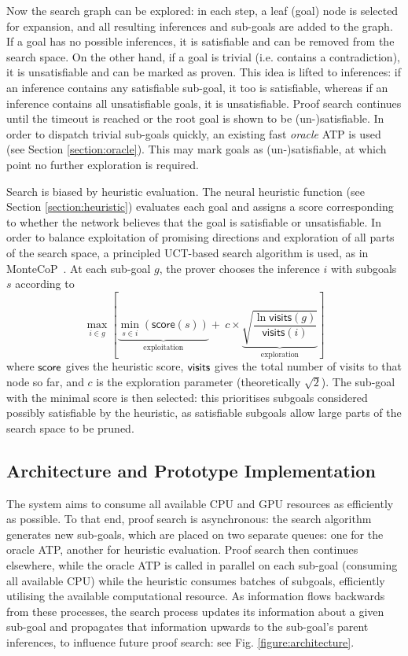 \documentclass{llncs}
\begin{document}
Now the search graph can be explored: in each step, a leaf (goal) node is selected for expansion, and all resulting inferences and sub-goals are added to the graph.
If a goal has no possible inferences, it is satisfiable and can be removed from the search space.
On the other hand, if a goal is trivial (i.e. contains a contradiction), it is unsatisfiable and can be marked as proven.
This idea is lifted to inferences: if an inference contains any satisfiable sub-goal, it too is satisfiable, whereas if an inference contains all unsatisfiable goals, it is unsatisfiable.
Proof search continues until the timeout is reached or the root goal is shown to be (un-)satisfiable.
In order to dispatch trivial sub-goals quickly, an existing fast \emph{oracle} ATP is used (see Section \ref{section:oracle}).
This may mark goals as (un-)satisfiable, at which point no further exploration is required.

Search is biased by heuristic evaluation.
The neural heuristic function (see Section \ref{section:heuristic}) evaluates each goal and assigns a score corresponding to whether the network believes that the goal is satisfiable or unsatisfiable.
In order to balance exploitation of promising directions and exploration of all parts of the search space, a principled UCT-based search algorithm is used, as in MonteCoP~\cite{MonteCoP}.
At each sub-goal $g$, the prover chooses the inference \(i\) with subgoals \(s\) according to
\[
	\max_{i \in g}\left[
		\underbrace{\min_{s \in i}\left(\textsf{score}(s)\right)}_\text{exploitation} +~
		c \times \underbrace{\sqrt{\frac{\ln\textsf{visits}\left(g\right)}{\textsf{visits}\left(i\right)}}}_\text{exploration}
	\right]
\]
where ${\sf score}$ gives the heuristic score, ${\sf visits}$ gives the total number of visits to that node so far, and \(c\) is the exploration parameter (theoretically \(\sqrt{2}\)).
The sub-goal with the minimal score is then selected: this prioritises subgoals considered possibly satisfiable by the heuristic, as satisfiable subgoals allow large parts of the search space to be pruned.

\subsection{Architecture and Prototype Implementation}
The system aims to consume all available CPU and GPU resources as efficiently as possible.
To that end, proof search is asynchronous: the search algorithm generates new sub-goals, which are placed on two separate queues: one for the oracle ATP, another for heuristic evaluation.
Proof search then continues elsewhere, while the oracle ATP is called in parallel on each sub-goal (consuming all available CPU) while the heuristic consumes batches of subgoals, efficiently utilising the available computational resource.
As information flows backwards from these processes, the search process updates its information about a given sub-goal and propagates that information upwards to the sub-goal's parent inferences, to influence future proof search: see Fig. \ref{figure:architecture}.
\end{document}

